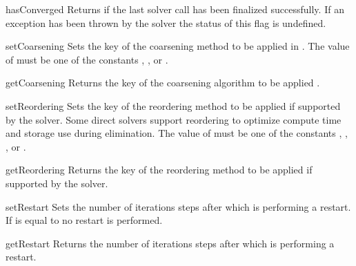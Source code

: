 \begin{methoddesc}[SolverOptions]{hasConverged}{}
Returns \True if the last solver call has been finalized successfully.
If an exception has been thrown by the solver the status of this flag is undefined.
\end{methoddesc}

\begin{methoddesc}[SolverOptions]{setCoarsening}{}
Sets the key of the coarsening method to be applied in \AMG.
The value of  must be one of the constants
, 
, or .
\end{methoddesc}

\begin{methoddesc}[SolverOptions]{getCoarsening}{}
Returns the key of the coarsening algorithm to be applied \AMG.
\end{methoddesc}

\begin{methoddesc}[SolverOptions]{setReordering}{}
Sets the key of the reordering method to be applied if supported by the solver. Some direct solvers support reordering to optimize compute time and storage use during elimination. The value of  must be one of the constants
 , , 
        , or .
\end{methoddesc}

\begin{methoddesc}[SolverOptions]{getReordering}{}
Returns the key of the reordering method to be applied if supported by the solver.
\end{methoddesc}

\begin{methoddesc}[SolverOptions]{setRestart}{}
Sets the number of iterations steps after which \GMRES is performing a restart.
If  is equal to  no restart is performed.
\end{methoddesc}


\begin{methoddesc}[SolverOptions]{getRestart}{}
Returns the number of iterations steps after which \GMRES is performing a restart.
\end{methoddesc}

